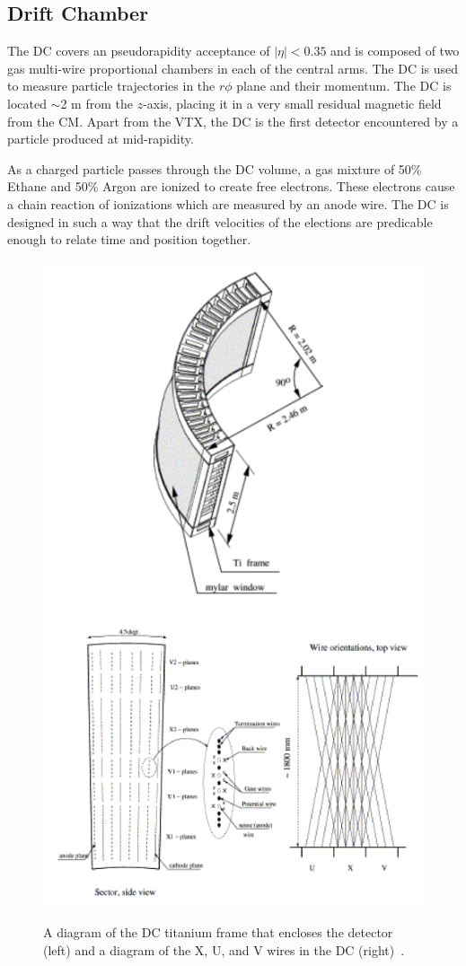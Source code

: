 \subsection{Drift Chamber}
The DC covers an pseudorapidity acceptance of $|\eta| < 0.35$ and is composed of two gas multi-wire proportional chambers in each of the central arms. The DC is used to measure particle trajectories in the $r\phi$ plane and their momentum.
The DC is located $\sim$2 m from the $z$-axis, placing it in a very small residual magnetic field from the CM. Apart from the VTX, the DC is the first detector encountered by a particle produced at mid-rapidity. 

As a charged particle passes through the DC volume, a gas mixture of 50\% Ethane and 50\% Argon are ionized to create free electrons. These electrons cause a chain reaction of ionizations which are measured by an anode wire. The DC is designed in such a way that the drift velocities of the elections are predicable enough to relate time and position together. 

\begin{figure}[!ht]
\centering
\includegraphics[width=0.45\linewidth]{figs/dc_diagram.png}
\includegraphics[width=0.45\linewidth]{figs/dc_wire_diagram.png}
\caption{A diagram of the DC titanium frame that encloses the detector (left) and a diagram of the X, U, and V wires in the DC (right)~\cite{Adcox2003469}.}
\label{fig:dc_diagram}
\end{figure}

